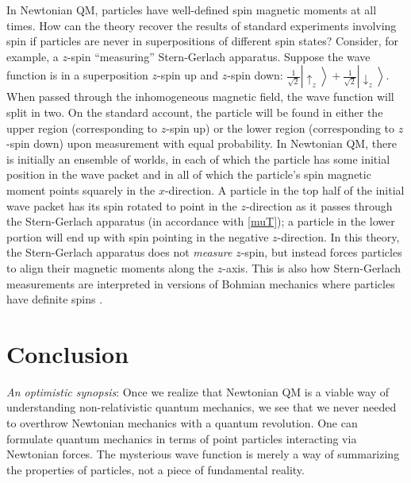 \documentclass[12pt,secnumarabic,balancelastpage,amsmath,amssymb,nofootinbib]{article}
\begin{document}
In Newtonian QM, particles have well-defined spin magnetic moments at all times.  How can the theory recover the results of standard experiments involving spin if particles are never in superpositions of different spin states?  Consider, for example, a $z$-spin ``measuring'' Stern-Gerlach apparatus.  Suppose the wave function is in a superposition $z$-spin up and $z$-spin down: $\frac{1}{\sqrt{2}}\left|\uparrow_z\right\rangle+\frac{1}{\sqrt{2}}\left|\downarrow_z\right\rangle$.  When passed through the inhomogeneous magnetic field, the wave function will split in two.  On the standard account, the particle will be found in either the upper region (corresponding to $z$-spin up) or the lower region (corresponding to $z$-spin down) upon measurement with equal probability.  In Newtonian QM, there is initially an ensemble of worlds, in each of which the particle has some initial position in the wave packet and in all of which the particle's spin magnetic moment points squarely in the $x$-direction.  A particle in the top half of the initial wave packet has its spin rotated to point in the $z$-direction as it passes through the Stern-Gerlach apparatus (in accordance with \eqref{muT}); a particle in the lower portion will end up with spin pointing in the negative $z$-direction.  In this theory, the Stern-Gerlach apparatus does not \emph{measure} $z$-spin, but instead forces particles to align their magnetic moments along the $z$-axis.  This is also how Stern-Gerlach measurements are interpreted in versions of Bohmian mechanics where particles have definite spins \citep[see][ch. 9]{dewdney1986,holland}.

\section{Conclusion}\label{conchshell}

\emph{An optimistic synopsis}: Once we realize that Newtonian QM is a viable way of understanding non-relativistic quantum mechanics, we see that we never needed to overthrow Newtonian mechanics with a quantum revolution.  One can formulate quantum mechanics in terms of point particles interacting via Newtonian forces.  The mysterious wave function is merely a way of summarizing the properties of particles, not a piece of fundamental reality.
\end{document}
